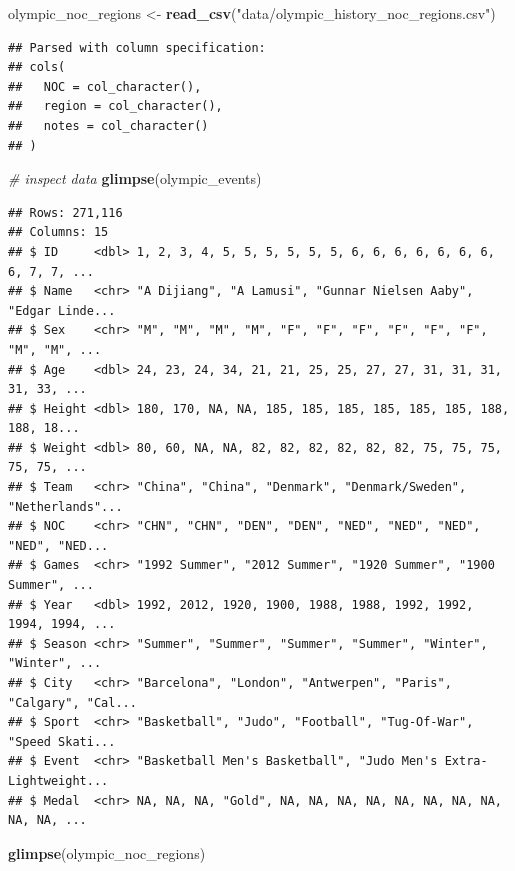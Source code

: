 \documentclass[
]{book}
\newenvironment{Shaded}{\begin{snugshade}}{\end{snugshade}}
\newcommand{\CommentTok}[1]{\textcolor[rgb]{0.56,0.35,0.01}{\textit{#1}}}
\newcommand{\KeywordTok}[1]{\textcolor[rgb]{0.13,0.29,0.53}{\textbf{#1}}}
\newcommand{\NormalTok}[1]{#1}
\newcommand{\StringTok}[1]{\textcolor[rgb]{0.31,0.60,0.02}{#1}}
\begin{document}
\begin{Shaded}
\begin{Highlighting}[]
\NormalTok{olympic_noc_regions <-}\StringTok{ }\KeywordTok{read_csv}\NormalTok{(}\StringTok{"data/olympic_history_noc_regions.csv"}\NormalTok{)}
\end{Highlighting}
\end{Shaded}

\begin{verbatim}
## Parsed with column specification:
## cols(
##   NOC = col_character(),
##   region = col_character(),
##   notes = col_character()
## )
\end{verbatim}

\begin{Shaded}
\begin{Highlighting}[]
\CommentTok{# inspect data }
\KeywordTok{glimpse}\NormalTok{(olympic_events)}
\end{Highlighting}
\end{Shaded}

\begin{verbatim}
## Rows: 271,116
## Columns: 15
## $ ID     <dbl> 1, 2, 3, 4, 5, 5, 5, 5, 5, 5, 6, 6, 6, 6, 6, 6, 6, 6, 7, 7, ...
## $ Name   <chr> "A Dijiang", "A Lamusi", "Gunnar Nielsen Aaby", "Edgar Linde...
## $ Sex    <chr> "M", "M", "M", "M", "F", "F", "F", "F", "F", "F", "M", "M", ...
## $ Age    <dbl> 24, 23, 24, 34, 21, 21, 25, 25, 27, 27, 31, 31, 31, 31, 33, ...
## $ Height <dbl> 180, 170, NA, NA, 185, 185, 185, 185, 185, 185, 188, 188, 18...
## $ Weight <dbl> 80, 60, NA, NA, 82, 82, 82, 82, 82, 82, 75, 75, 75, 75, 75, ...
## $ Team   <chr> "China", "China", "Denmark", "Denmark/Sweden", "Netherlands"...
## $ NOC    <chr> "CHN", "CHN", "DEN", "DEN", "NED", "NED", "NED", "NED", "NED...
## $ Games  <chr> "1992 Summer", "2012 Summer", "1920 Summer", "1900 Summer", ...
## $ Year   <dbl> 1992, 2012, 1920, 1900, 1988, 1988, 1992, 1992, 1994, 1994, ...
## $ Season <chr> "Summer", "Summer", "Summer", "Summer", "Winter", "Winter", ...
## $ City   <chr> "Barcelona", "London", "Antwerpen", "Paris", "Calgary", "Cal...
## $ Sport  <chr> "Basketball", "Judo", "Football", "Tug-Of-War", "Speed Skati...
## $ Event  <chr> "Basketball Men's Basketball", "Judo Men's Extra-Lightweight...
## $ Medal  <chr> NA, NA, NA, "Gold", NA, NA, NA, NA, NA, NA, NA, NA, NA, NA, ...
\end{verbatim}

\begin{Shaded}
\begin{Highlighting}[]
\KeywordTok{glimpse}\NormalTok{(olympic_noc_regions)}
\end{Highlighting}
\end{Shaded}
\end{document}
